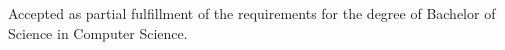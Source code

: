 {\begin{flushleft}
					
			\hspace{2em} Accepted as partial fulfillment of the requirements for the degree of Bachelor of Science in Computer Science.\\[44pt]
			
			

\end{flushleft}}
